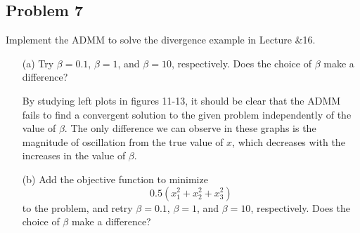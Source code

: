 \documentclass[answers]{exam}
\begin{document}
\subsection*{Problem 7} Implement the ADMM to solve the divergence example in Lecture \&16.
\begin{itemize}
\item[(a)] Try $\beta=0.1$, $\beta=1$, and $\beta=10$, respectively. Does the choice of $\beta$ make a difference? 

\begin{framed}
By studying left plots in figures 11-13, it should be clear that the ADMM fails to find a convergent solution to the given problem independently of the value of $\beta$. The only difference we can observe in these graphs is the magnitude of oscillation from the true value of $x$, which decreases with the increases in the value of $\beta$.
\end{framed}
\newpage
\item[(b)] Add the objective function to minimize
\[0.5(x^2_1+x^2_2+x^2_3)\]
to the problem, and retry $\beta=0.1$, $\beta=1$, and $\beta=10$, respectively. Does the choice of $\beta$ make a difference?


\end{itemize}
\end{document}
